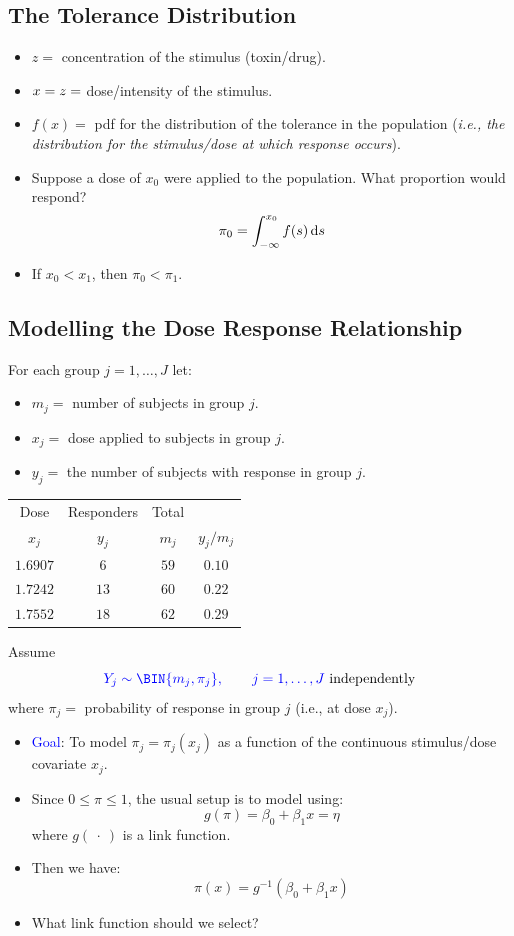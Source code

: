 \documentclass[oneside]{book}\usepackage[]{graphicx}\usepackage[svgnames]{xcolor}
\let\log\relax%
\begin{document}
\subsection*{The Tolerance Distribution}
\begin{itemize}
    \item $ z =$ concentration of the stimulus (toxin/drug).
    \item $ x=\log{z} =$ dose/intensity of the stimulus.
    \item $ f(x)= $ pdf for the distribution of the tolerance in the population (\emph{i.e., the
              distribution for the stimulus/dose at which response occurs}).
    \item Suppose a dose of $ x_0 $ were applied to the population. What proportion would
          respond?
          \[ \pi_0=\int_{-\infty}^{x_0}f(s)\odif{s} \]
    \item If $ x_0<x_1 $, then $ \pi_0<\pi_1 $.
\end{itemize}
\subsection*{Modelling the Dose Response Relationship}
For each group $ j=1,\ldots,J $ let:
\begin{itemize}
    \item $ m_j= $ number of subjects in group $ j $.
    \item $ x_j= $ dose applied to subjects in group $ j $.
    \item $ y_j= $ the number of subjects with response in group $ j $.
\end{itemize}
\begin{table}[!htbp]
    \centering
    \begin{NiceTabular}{cccc}
        \toprule
        Dose & Responders & Total\\
        $ x_j $ & $ y_j $ & $ m_j $ & $ y_j/m_j $\\
        \midrule
        $ 1.6907 $ & $ 6 $ & $ 59 $ & $ 0.10 $\\
        $ 1.7242 $ & $ 13 $ & $ 60 $ & $ 0.22 $\\
        $ 1.7552 $ & $ 18 $ & $ 62 $ & $ 0.29 $\\
        \bottomrule
    \end{NiceTabular}
\end{table}
Assume
\[ \textcolor{Blue}{Y_j \sim \BIN{m_j,\pi_j},\qquad j=1,\ldots,J} \text{ independently} \]
where $ \pi_j= $ probability of response in group $ j $ (i.e., at dose $ x_j $).
\begin{itemize}
    \item \textcolor{Blue}{Goal}: To model $ \pi_j=\pi_j(x_j) $ as a function of the continuous stimulus/dose covariate $ x_j $.
    \item Since $ 0\le \pi\le 1 $, the usual setup is to model using:
          \[ g(\pi)=\beta_0+\beta_1x=\eta \]
          where $ g(\:\cdot\:) $ is a link function.
    \item Then we have:
          \[ \pi(x)=g^{-1}(\beta_0+\beta_1x) \]
    \item What link function should we select?
\end{itemize}
\end{document}
